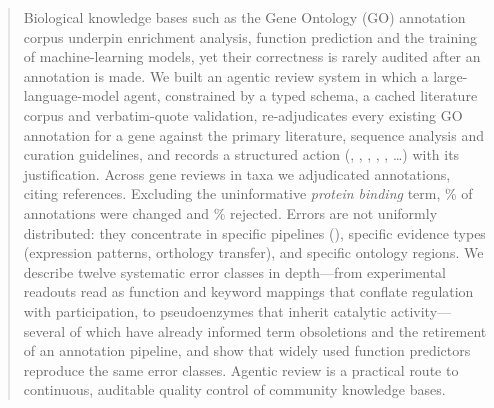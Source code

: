 \begin{abstract}
Biological knowledge bases such as the Gene Ontology (GO) annotation corpus underpin enrichment
analysis, function prediction and the training of machine-learning models, yet their
correctness is rarely audited after an annotation is made. We built an agentic review system
in which a large-language-model agent, constrained by a typed schema, a cached literature
corpus and verbatim-quote validation, re-adjudicates every existing GO annotation for a gene
against the primary literature, sequence analysis and curation guidelines, and records a
structured action (, , , ,
, \ldots) with its justification. Across \nReviews{} gene reviews
in \nOrgFolders{} taxa we adjudicated \nAnn{} annotations, citing \nRefs{} references.
Excluding the uninformative \emph{protein binding} term, \pctChangedNoPB\% of annotations were
changed and \pctRejectedNoPB\% rejected. Errors are not uniformly distributed: they
concentrate in specific pipelines (), specific evidence types (expression
patterns, orthology transfer), and specific ontology regions. We describe twelve systematic error
classes in depth---from experimental readouts read as function and keyword mappings that conflate
regulation with participation, to pseudoenzymes that inherit catalytic activity---several of which
have already informed term obsoletions and the retirement of an annotation pipeline, and
show that widely used function predictors reproduce the same error classes.  Agentic review is a practical route to continuous, auditable quality control of
community knowledge bases.
\end{abstract}
